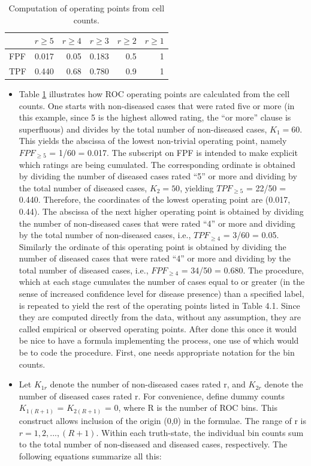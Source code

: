 \documentclass[
]{book}
\begin{document}
\begin{table}

\caption{\label{tab:ratingsParadigmTable2}Computation of operating points from cell counts.}
\centering
\begin{tabular}[t]{l|r|r|r|r|r}
\hline
  & $r\ge 5$ & $r\ge 4$ & $r\ge 3$ & $r\ge 2$ & $r\ge 1$\\
\hline
FPF & 0.017 & 0.05 & 0.183 & 0.5 & 1\\
\hline
TPF & 0.440 & 0.68 & 0.780 & 0.9 & 1\\
\hline
\end{tabular}
\end{table}

\begin{itemize}
\item
  Table \ref{tab:ratingsParadigmTable2} illustrates how ROC operating points are calculated from the cell counts. One starts with non-diseased cases that were rated five or more (in this example, since 5 is the highest allowed rating, the ``or more'' clause is superfluous) and divides by the total number of non-diseased cases, \(K_1 = 60\). This yields the abscissa of the lowest non-trivial operating point, namely \(FPF_{\ge5}\) = 1/60 = 0.017. The subscript on FPF is intended to make explicit which ratings are being cumulated. The corresponding ordinate is obtained by dividing the number of diseased cases rated ``5'' or more and dividing by the total number of diseased cases, \(K_2 = 50\), yielding \(TPF_{\ge5}\) = 22/50 = 0.440. Therefore, the coordinates of the lowest operating point are (0.017, 0.44). The abscissa of the next higher operating point is obtained by dividing the number of non-diseased cases that were rated ``4'' or more and dividing by the total number of non-diseased cases, i.e., \(TPF_{\ge4}\) = 3/60 = 0.05. Similarly the ordinate of this operating point is obtained by dividing the number of diseased cases that were rated ``4'' or more and dividing by the total number of diseased cases, i.e., \(FPF_{\ge4}\) = 34/50 = 0.680. The procedure, which at each stage cumulates the number of cases equal to or greater (in the sense of increased confidence level for disease presence) than a specified label, is repeated to yield the rest of the operating points listed in Table 4.1. Since they are computed directly from the data, without any assumption, they are called empirical or observed operating points. After done this once it would be nice to have a formula implementing the process, one use of which would be to code the procedure. First, one needs appropriate notation for the bin counts.
\item
  Let \(K_{1r}\) denote the number of non-diseased cases rated r, and \(K_{2r}\) denote the number of diseased cases rated r. For convenience, define dummy counts \(K_{1{(R+1)}}\) = \(K_{2{(R+1)}}\) = 0, where R is the number of ROC bins. This construct allows inclusion of the origin (0,0) in the formulae. The range of r is \(r = 1,2,...,(R+1)\). Within each truth-state, the individual bin counts sum to the total number of non-diseased and diseased cases, respectively. The following equations summarize all this:
\end{itemize}
\end{document}
